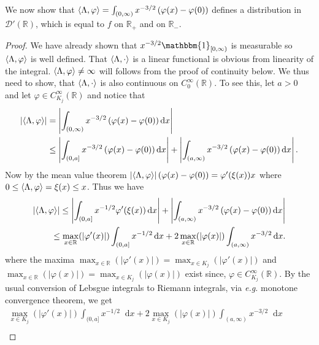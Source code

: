 \documentclass[a4paper,11pt]{article}
\newcommand{\abs}[1]{\left\lvert #1 \right\rvert}
\newcommand*\diff{\mathop{}\!\mathrm{d}}
\newcommand{\eg}{\emph{e.g.} }
\newcommand{\R}{\mathbb{R}}
\numberwithin{equation}{section}
\begin{document}
We now show that $ \braket{\Lambda,\varphi}=\int_{(0,\infty)}x^{-3/2}\left(\varphi(x)-\varphi(0)\right) $ defines a distribution in $ \mathcal{D}'(\R) $, which is equal to $ f $ on $ \R_+ $ and on $ \R_- $. \begin{proof}
	We have already shown that $ x^{-3/2}\mathbbm{1}_{[0,\infty)} $ is measurable so $ \braket{\Lambda,\varphi} $ is well defined.  That $ \braket{\Lambda,\cdot} $ is a linear functional is obvious from linearity of the integral. $ \braket{\Lambda,\varphi}\neq\infty $ will follows from the proof of continuity below. We thus need to show, that $ \braket{\Lambda,\cdot} $ is also continuous on $ C^\infty_0(\R) $. To see this, let $ a>0 $ and let $ \varphi\in C_{K_j}^\infty(\R) $ and notice that \begin{equation}
\begin{aligned}
	\abs{\braket{\Lambda,\varphi}}&=\abs{\int_{(0,\infty)}x^{-3/2}\left(\varphi(x)-\varphi(0)\right)\diff x}\\&\leq\abs{\int_{(0,a]}x^{-3/2}\left(\varphi(x)-\varphi(0)\right)\diff x}+\abs{\int_{(a,\infty)}x^{-3/2}\left(\varphi(x)-\varphi(0)\right)\diff x}.
\end{aligned}
	\end{equation}
	Now by the mean value theorem $ \abs{\braket{\Lambda,\varphi}}\left(\varphi(x)-\varphi(0)\right)=\varphi'(\xi(x))x $ where $ 0\leq \braket{\Lambda,\varphi}=\xi(x)\leq x $. Thus we have \begin{equation}
	\begin{aligned}
	\abs{\braket{\Lambda,\varphi}}\leq\abs{\int_{(0,a]}x^{-1/2}\varphi'(\xi(x))\diff x}+\abs{\int_{(a,\infty)}x^{-3/2}\left(\varphi(x)-\varphi(0)\right)\diff x}\\
	\leq \max_{x\in \R }(\abs{\varphi'(x)})\int_{(0,a]} x^{-1/2}\diff x+2\max_{x\in \R }(\abs{\varphi(x)})\int_{(a,\infty)} x^{-3/2}\diff x.
	\end{aligned}
	\end{equation}
	where the maxima $ \max_{x\in \R}(\abs{\varphi'(x)})=\max_{x\in K_j }(\abs{\varphi'(x)}) $ and $ \max_{x\in \R }(\abs{\varphi(x)})=\max_{x\in K_j }(\abs{\varphi(x)}) $ exist since, $ \varphi \in C^{\infty}_{K_j}(\R) $. By the usual conversion of Lebsgue integrals to Riemann integrals, via \eg monotone convergence theorem, we get \begin{equation}
	\begin{aligned}
	\max_{x\in K_j }(\abs{\varphi'(x)})\int_{(0,a]} x^{-1/2}\diff x+2\max_{x\in K_j}(\abs{\varphi(x)})\int_{(a,\infty)} x^{-3/2}\diff x\qquad\qquad\qquad\qquad\qquad\qquad\\

\end{aligned}
\end{equation}
\end{proof}
\end{document}
